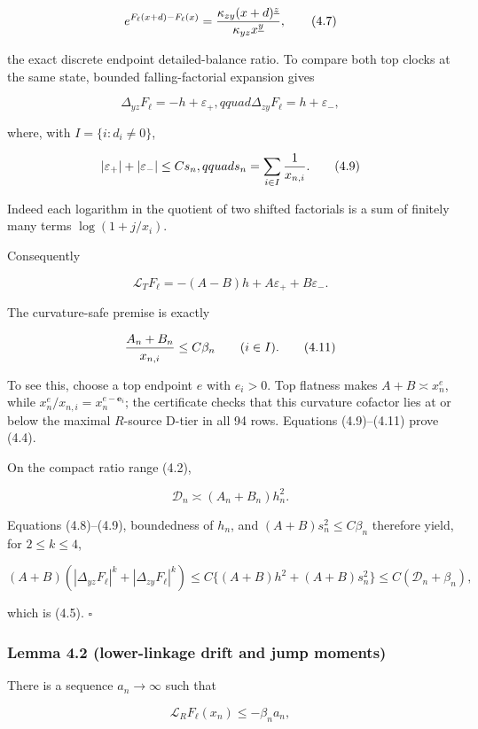 \[
 e^{F_\ell(x+d)-F_\ell(x)}
 ={\kappa_{zy}(x+d)^{\underline z}
    \over \kappa_{yz}x^{\underline y}},            \tag{4.7}
\]

the exact discrete endpoint detailed-balance ratio. To compare both top
clocks at the same state, bounded falling-factorial expansion gives

\[
 \Delta_{y z}F_\ell=-h+\varepsilon_+,qquad
 \Delta_{z y}F_\ell=h+\varepsilon_-,               \tag{4.8}
\]

where, with \(I=\{i:d_i\ne0\}\),

\[
 |\varepsilon_+|+|\varepsilon_-|
 \le C s_n,qquad s_n=\sum_{i\in I}{1\over x_{n,i}}. \tag{4.9}
\]

Indeed each logarithm in the quotient of two shifted factorials is a sum
of finitely many terms \(\log(1+j/x_i)\).

Consequently

\[
 \mathcal L_TF_\ell
 =-(A-B)h+A\varepsilon_++B\varepsilon_-.
                                                               \tag{4.10}
\]

The curvature-safe premise is exactly

\[
 {A_n+B_n\over x_{n,i}}\le C\beta_n
 \qquad(i\in I).                                    \tag{4.11}
\]

To see this, choose a top endpoint \(e\) with \(e_i>0\). Top flatness
makes \(A+B\asymp x_n^e\), while \(x_n^e/x_{n,i}=x_n^{e-\mathbf e_i}\);
the certificate checks that this curvature cofactor lies at or below the
maximal \(R\)-source D-tier in all 94 rows. Equations (4.9)--(4.11)
prove (4.4).

On the compact ratio range (4.2),

\[
 \mathcal D_n\asymp(A_n+B_n)h_n^2.                 \tag{4.12}
\]

Equations (4.8)--(4.9), boundedness of \(h_n\), and
\((A+B)s_n^2\le C\beta_n\) therefore yield, for \(2\le k\le4\),

\[
 (A+B)(|\Delta_{yz}F_\ell|^k+|\Delta_{zy}F_\ell|^k)
 \le C\{(A+B)h^2+(A+B)s_n^2\}
 \le C(\mathcal D_n+\beta_n),
\]

which is (4.5). \(\square\)

\subsubsection{Lemma 4.2 (lower-linkage drift and jump
moments)}

There is a sequence \(a_n\to\infty\) such that

\[
 \mathcal L_RF_\ell(x_n)\le-\beta_na_n,             \tag{4.13}
\]

